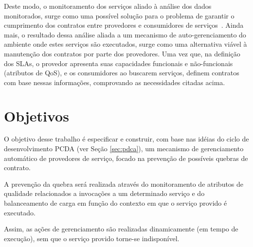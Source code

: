 Deste modo, o monitoramento dos serviços aliado à análise dos dados monitorados, surge como uma possível solução para o problema de garantir o cumprimento dos contratos entre provedores e consumidores de serviços~\cite{papazoglou2008service}. Ainda mais, o resultado dessa análise aliada a um mecanismo de auto-gerenciamento do ambiente onde estes serviços são executados, surge como uma alternativa viável à manutenção dos contratos por parte dos provedores. Uma vez que, na definição dos SLAs, o provedor apresenta suas capacidades funcionais e não-funcionais (atributos de QoS), e os consumidores ao buscarem serviços, definem contratos com base nessas informações, comprovando as necessidades citadas acima.

\section{Objetivos}
\label{sec:obj}

O objetivo desse trabalho é especificar e construir, com base nas idéias do ciclo de desenvolvimento PCDA (ver Seção \ref{sec:pdca}), um mecanismo de gerenciamento automático de provedores de serviço, focado na prevenção de possíveis quebras de contrato.

A prevenção da quebra será realizada através do monitoramento de atributos de qualidade relacionados a invocações a um determinado serviço e do balanceamento de carga em função do contexto em que o serviço provido é executado. 

Assim, as ações de gerenciamento são realizadas dinamicamente (em tempo de execução), sem que o serviço provido torne-se indisponível.



